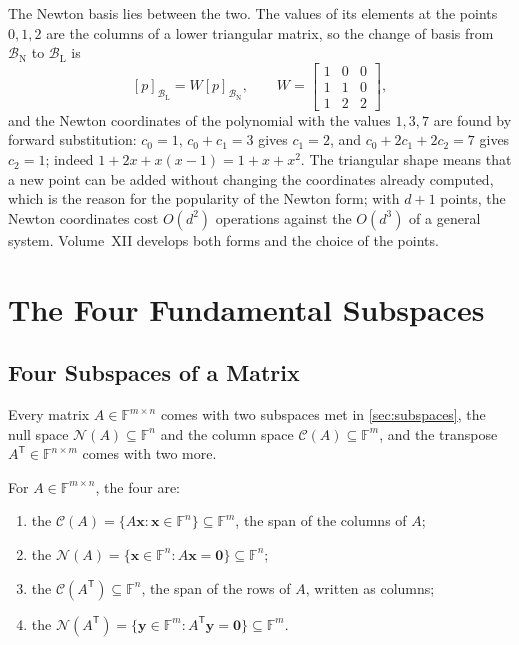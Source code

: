 The Newton basis lies between the two. The values of its elements at the points $0,1,2$ are the columns of a lower triangular matrix, so the change of basis from $\mathcal B_{\mathrm N}$ to $\mathcal B_{\mathrm L}$ is
\[
[p]_{\mathcal B_{\mathrm L}}=W[p]_{\mathcal B_{\mathrm N}},\qquad W=\begin{bmatrix}1&0&0\\1&1&0\\1&2&2\end{bmatrix},
\]
and the Newton coordinates of the polynomial with the values $1,3,7$ are found by forward substitution: $c_0=1$, $c_0+c_1=3$ gives $c_1=2$, and $c_0+2c_1+2c_2=7$ gives $c_2=1$; indeed $1+2x+x(x-1)=1+x+x^2$. The triangular shape means that a new point can be added without changing the coordinates already computed, which is the reason for the popularity of the Newton form; with $d+1$ points, the Newton coordinates cost $O(d^2)$ operations against the $O(d^3)$ of a general system. Volume~XII develops both forms and the choice of the points.

\section{The Four Fundamental Subspaces}
\label{sec:four-subspaces}

\subsection{Four Subspaces of a Matrix}

Every matrix $A\in\mathbb F^{m\times n}$ comes with two subspaces met in \cref{sec:subspaces}, the null space $\mathcal N(A)\subseteq\mathbb F^n$ and the column space $\mathcal C(A)\subseteq\mathbb F^m$, and the transpose $A^{\mathsf T}\in\mathbb F^{n\times m}$ comes with two more.

\begin{definition}
\label{def:four-subspaces}
For $A\in\mathbb F^{m\times n}$, the four  are:
\begin{enumerate}
\item the  $\mathcal C(A)=\{A\mathbf x: \mathbf x\in\mathbb F^n\}\subseteq\mathbb F^m$, the span of the columns of $A$;
\item the  $\mathcal N(A)=\{\mathbf x\in\mathbb F^n: A\mathbf x=\mathbf 0\}\subseteq\mathbb F^n$;
\item the  $\mathcal C(A^{\mathsf T})\subseteq\mathbb F^n$, the span of the rows of $A$, written as columns;
\item the  $\mathcal N(A^{\mathsf T})=\{\mathbf y\in\mathbb F^m: A^{\mathsf T}\mathbf y=\mathbf 0\}\subseteq\mathbb F^m$.
\end{enumerate}
\end{definition}

